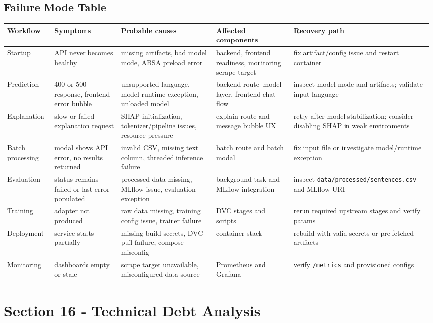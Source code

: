 \subsection{Failure Mode Table}
\begin{longtable}{@{}p{}p{}p{}p{}p{}@{}}
\toprule
\textbf{Workflow} & \textbf{Symptoms} & \textbf{Probable causes} & \textbf{Affected components} & \textbf{Recovery path} \\
\midrule
\endhead
Startup & API never becomes healthy & missing artifacts, bad model mode, ABSA preload error & backend, frontend readiness, monitoring scrape target & fix artifact/config issue and restart container \\
Prediction & 400 or 500 response, frontend error bubble & unsupported language, model runtime exception, unloaded model & backend route, model layer, frontend chat flow & inspect model mode and artifacts; validate input language \\
Explanation & slow or failed explanation request & SHAP initialization, tokenizer/pipeline issues, resource pressure & explain route and message bubble UX & retry after model stabilization; consider disabling SHAP in weak environments \\
Batch processing & modal shows API error, no results returned & invalid CSV, missing text column, threaded inference failure & batch route and batch modal & fix input file or investigate model/runtime exception \\
Evaluation & status remains failed or last error populated & processed data missing, MLflow issue, evaluation exception & background task and MLflow integration & inspect \texttt{data/processed/sentences.csv} and MLflow URI \\
Training & adapter not produced & raw data missing, training config issue, trainer failure & DVC stages and scripts & rerun required upstream stages and verify params \\
Deployment & service starts partially & missing build secrets, DVC pull failure, compose misconfig & container stack & rebuild with valid secrets or pre-fetched artifacts \\
Monitoring & dashboards empty or stale & scrape target unavailable, misconfigured data source & Prometheus and Grafana & verify \texttt{/metrics} and provisioned configs \\
\bottomrule
\end{longtable}

\section{Section 16 - Technical Debt Analysis}
